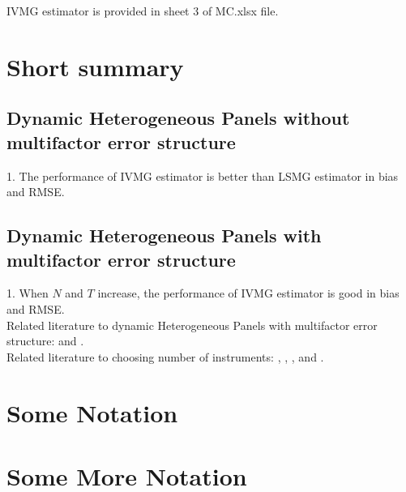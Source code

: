 \documentclass[12pt,a4paper,hyperref]{article}
\begin{document}
IVMG estimator is provided in sheet 3 of MC.xlsx file. \\

\section{Short summary}
\subsection{Dynamic Heterogeneous Panels without multifactor error structure}
1. The performance of IVMG estimator is better than LSMG estimator in bias and RMSE.


\subsection{Dynamic Heterogeneous Panels with multifactor error structure}
1. When $N$ and $T$ increase, the performance of IVMG estimator is good in bias and RMSE. \\
Related literature to dynamic Heterogeneous Panels with multifactor error structure: \citet{Chudik:2015} and \citet{Norkute:2019}.\\
Related literature to choosing number of instruments: \citet{Stephen:2001}, \citet{Swanson:2005}, \citet{Marine:2012}, \citet{Bai:2010} and \citet{Kang:2019}.


\newpage

\renewcommand\refname{References}



\begin{appendices}
\section{Some Notation}

\section{Some More Notation}
\end{appendices}
\end{document}
